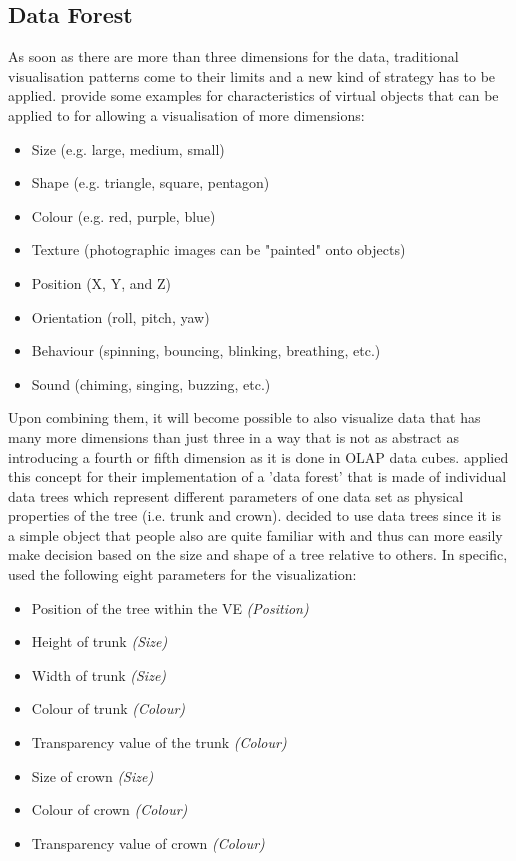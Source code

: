 
\subsection{Data Forest}

As soon as there are more than three dimensions for the data, traditional visualisation patterns come to their limits and a new kind of strategy has to be applied. \cite{Stone1994} provide some examples for characteristics of virtual objects that can be applied to for allowing a visualisation of more dimensions:
\begin{itemize}[noitemsep,nolistsep]
	\item Size (e.g. large, medium, small)
	\item Shape (e.g. triangle, square, pentagon)
	\item Colour (e.g. red, purple, blue)
	\item Texture (photographic images can be "painted" onto objects)
	\item Position (X, Y, and Z)
	\item Orientation (roll, pitch, yaw)
	\item Behaviour (spinning, bouncing, blinking, breathing, etc.)
	\item Sound (chiming, singing, buzzing, etc.)
\end{itemize}
Upon combining them, it will become possible to also visualize data that has many more dimensions than just three in a way that is not as abstract as introducing a fourth or fifth dimension as it is done in OLAP data cubes. \cite{Jamieson2007} applied this concept for their implementation of a 'data forest' that is made of individual data trees which represent different parameters of one data set as physical properties of the tree (i.e. trunk and crown). \cite{Jamieson2007} decided to use data trees since it is a simple object that people also are quite familiar with and thus can more easily make decision based on the size and shape of a tree relative to others. In specific, \cite{Jamieson2007} used the following eight parameters for the visualization:
\begin{itemize}[noitemsep,nolistsep]
	\item Position of the tree within the VE \textit{(Position)}
	\item Height of trunk \textit{(Size)}
	\item Width of trunk \textit{(Size)}
	\item Colour of trunk \textit{(Colour)}
	\item Transparency value of the trunk \textit{(Colour)}
	\item Size of crown \textit{(Size)}
	\item Colour of crown  \textit{(Colour)}
	\item Transparency value of crown  \textit{(Colour)}
\end{itemize}
